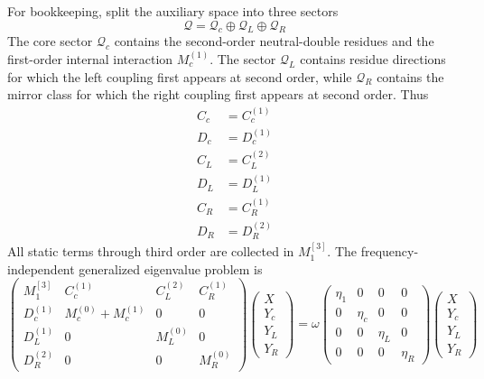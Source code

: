 \documentclass[aip,jcp,reprint,noshowkeys,superscriptaddress]{revtex4-1}
\begin{document}
For bookkeeping, split the auxiliary space into three sectors
\begin{equation}
	\mathcal Q
	=
	\mathcal Q_c
	\oplus
	\mathcal Q_L
	\oplus
	\mathcal Q_R
	\label{eq:Q_aux_split}
\end{equation}
The core sector $\mathcal Q_c$ contains the second-order neutral-double residues and the first-order internal interaction $M_c^{(1)}$.
The sector $\mathcal Q_L$ contains residue directions for which the left coupling first appears at second order, while $\mathcal Q_R$ contains the mirror class for which the right coupling first appears at second order.
Thus
\begin{align}
	C_c
	&=
	C_c^{(1)}
	\\
	D_c
	&=
	D_c^{(1)}
	\\
	C_L
	&=
	C_L^{(2)}
	\\
	D_L
	&=
	D_L^{(1)}
	\\
	C_R
	&=
	C_R^{(1)}
	\\
	D_R
	&=
	D_R^{(2)}
	\label{eq:coupling_orders}
\end{align}
All static terms through third order are collected in $M_1^{[3]}$.
The frequency-independent generalized eigenvalue problem is
\begin{equation}
	\begin{pmatrix}
	M_1^{[3]}
	& C_c^{(1)}
	& C_L^{(2)}
	& C_R^{(1)}
	\\
	D_c^{(1)}
	& M_c^{(0)}+M_c^{(1)}
	& 0
	& 0
	\\
	D_L^{(1)}
	& 0
	& M_L^{(0)}
	& 0
	\\
	D_R^{(2)}
	& 0
	& 0
	& M_R^{(0)}
	\end{pmatrix}
	\begin{pmatrix}
	X
	\\
	Y_c
	\\
	Y_L
	\\
	Y_R
	\end{pmatrix}
	=
	\omega
	\begin{pmatrix}
	\eta_1&0&0&0
	\\
	0&\eta_c&0&0
	\\
	0&0&\eta_L&0
	\\
	0&0&0&\eta_R
	\end{pmatrix}
	\begin{pmatrix}
	X
	\\
	Y_c
	\\
	Y_L
	\\
	Y_R
	\end{pmatrix}
	\label{eq:generalized_eigenproblem}
\end{equation}
\end{document}
